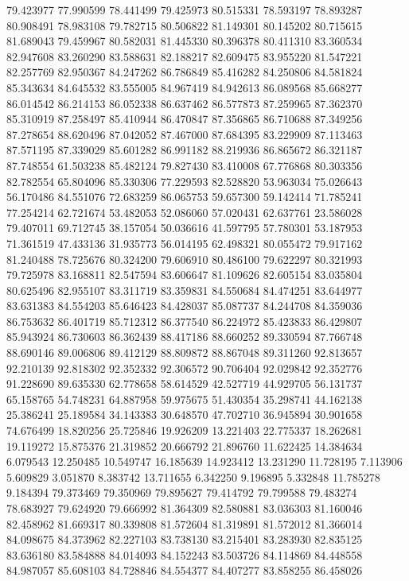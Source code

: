 79.423977
77.990599
78.441499
79.425973
80.515331
78.593197
78.893287
80.908491
78.983108
79.782715
80.506822
81.149301
80.145202
80.715615
81.689043
79.459967
80.582031
81.445330
80.396378
80.411310
83.360534
82.947608
83.260290
83.588631
82.188217
82.609475
83.955220
81.547221
82.257769
82.950367
84.247262
86.786849
85.416282
84.250806
84.581824
85.343634
84.645532
83.555005
84.967419
84.942613
86.089568
85.668277
86.014542
86.214153
86.052338
86.637462
86.577873
87.259965
87.362370
85.310919
87.258497
85.410944
86.470847
87.356865
86.710688
87.349256
87.278654
88.620496
87.042052
87.467000
87.684395
83.229909
87.113463
87.571195
87.339029
85.601282
86.991182
88.219936
86.865672
86.321187
87.748554
61.503238
85.482124
79.827430
83.410008
67.776868
80.303356
82.782554
65.804096
85.330306
77.229593
82.528820
53.963034
75.026643
56.170486
84.551076
72.683259
86.065753
59.657300
59.142414
71.785241
77.254214
62.721674
53.482053
52.086060
57.020431
62.637761
23.586028
79.407011
69.712745
38.157054
50.036616
41.597795
57.780301
53.187953
71.361519
47.433136
31.935773
56.014195
62.498321
80.055472
79.917162
81.240488
78.725676
80.324200
79.606910
80.486100
79.622297
80.321993
79.725978
83.168811
82.547594
83.606647
81.109626
82.605154
83.035804
80.625496
82.955107
83.311719
83.359831
84.550684
84.474251
83.644977
83.631383
84.554203
85.646423
84.428037
85.087737
84.244708
84.359036
86.753632
86.401719
85.712312
86.377540
86.224972
85.423833
86.429807
85.943924
86.730603
86.362439
88.417186
88.660252
89.330594
87.766748
88.690146
89.006806
89.412129
88.809872
88.867048
89.311260
92.813657
92.210139
92.818302
92.352332
92.306572
90.706404
92.029842
92.352776
91.228690
89.635330
62.778658
58.614529
42.527719
44.929705
56.131737
65.158765
54.748231
64.887958
59.975675
51.430354
35.298741
44.162138
25.386241
25.189584
34.143383
30.648570
47.702710
36.945894
30.901658
74.676499
18.820256
25.725846
19.926209
13.221403
22.775337
18.262681
19.119272
15.875376
21.319852
20.666792
21.896760
11.622425
14.384634
6.079543
12.250485
10.549747
16.185639
14.923412
13.231290
11.728195
7.113906
5.609829
3.051870
8.383742
13.711655
6.342250
9.196895
5.332848
11.785278
9.184394
79.373469
79.350969
79.895627
79.414792
79.799588
79.483274
78.683927
79.624920
79.666992
81.364309
82.580881
83.036303
81.160046
82.458962
81.669317
80.339808
81.572604
81.319891
81.572012
81.366014
84.098675
84.373962
82.227103
83.738130
83.215401
83.283930
82.835125
83.636180
83.584888
84.014093
84.152243
83.503726
84.114869
84.448558
84.987057
85.608103
84.728846
84.554377
84.407277
83.858255
86.458026
